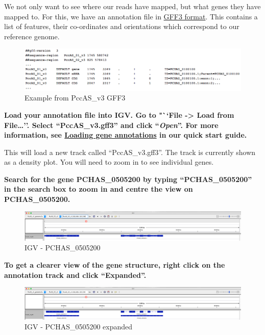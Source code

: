 \documentclass[11pt]{article}
\begin{document}
\newpage

We not only want to see where our reads have mapped, but what genes they
have mapped to. For this, we have an annotation file in
\href{https://www.ensembl.org/info/website/upload/gff3.html}{GFF3
format}. This contains a list of features, their co-ordinates and
orientations which correspond to our reference genome.

    \begin{figure}[!h]
\centering
\includegraphics{images/PccAS_v3_gff3.png}
\caption{Example from PccAS\_v3 GFF3}
\end{figure}

    \textbf{Load your annotation file into IGV. Go to "``File
-\textgreater{} Load from File\ldots{}''. Select ``PccAS\_v3.gff3'' and
click ``\textit{Open}''. For more information, see
\href{https://github.com/sanger-pathogens/pathogen-informatics-training/blob/master/Notebooks/IGV/index.ipynb}{Loading
gene annotations} in our quick start guide.}

This will load a new track called ``PccAS\_v3.gff3''. The track is
currently shown as a density plot. You will need to zoom in to see
individual genes.

\textbf{Search for the gene PCHAS\_0505200 by typing ``PCHAS\_0505200''
in the search box to zoom in and centre the view on PCHAS\_0505200.}

    \begin{figure}[!h]
\centering
\includegraphics{images/igv-gene.png}
\caption{IGV - PCHAS\_0505200}
\end{figure}

    \textbf{To get a clearer view of the gene structure, right click on the
annotation track and click ``Expanded''.}

    \begin{figure}[!h]
\centering
\includegraphics{images/igv-gene-structure.png}
\caption{IGV - PCHAS\_0505200 expanded}
\end{figure}
\end{document}
